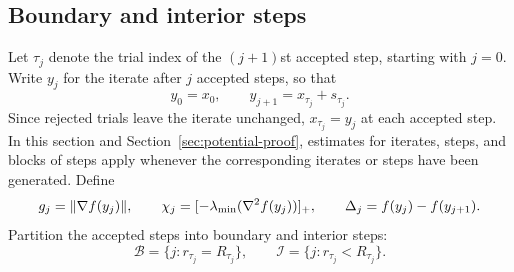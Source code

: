 \subsection{Boundary and interior steps}
\label{sec:accepted-steps}
Let $\tau_j$ denote the trial index of the $(j+1)$st accepted step, starting
with $j=0$. Write $y_j$ for the iterate after $j$ accepted steps, so that
\begin{equation}\label{eq:accepted-points}
 y_0=x_0,\qquad y_{j+1}=x_{\tau_j}+s_{\tau_j}.
\end{equation}
Since rejected trials leave the iterate unchanged, $x_{\tau_j}=y_j$ at
each accepted step. In this section and Section~\ref{sec:potential-proof},
estimates for iterates, steps, and blocks of steps apply whenever the
corresponding iterates or steps have been generated.
Define
\begin{equation}\label{eq:accepted-measures}
 g_j=\lVert\nabla f(y_j)\rVert,\qquad
 \chi_j=[-\lambda_{\min}(\nabla^2f(y_j))]_+,\qquad
 \Delta_j=f(y_j)-f(y_{j+1}).
\end{equation}
Partition the accepted steps into boundary and interior steps:
\begin{equation}\label{eq:step-sets}
 \mathcal B=\{j:r_{\tau_j}=R_{\tau_j}\},\qquad
 \mathcal I=\{j:r_{\tau_j}<R_{\tau_j}\}.
\end{equation}

